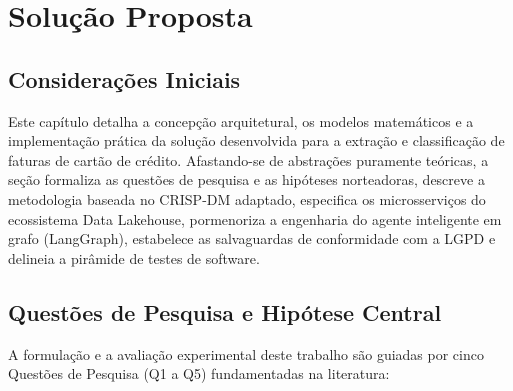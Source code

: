 \documentclass[
	12pt,				
	openright,			
	oneside,			
	a4paper,			
	english,			
	brazil				
	]{abntex2}
\begin{document}
\chapter{Solução Proposta}
\label{chp:solucao_proposta}

\section{Considerações Iniciais}
\label{sec:sol_consideracoes_iniciais}

Este capítulo detalha a concepção arquitetural, os modelos matemáticos e a implementação prática da solução desenvolvida para a extração e classificação de faturas de cartão de crédito. Afastando-se de abstrações puramente teóricas, a seção formaliza as questões de pesquisa e as hipóteses norteadoras, descreve a metodologia baseada no CRISP-DM adaptado, especifica os microsserviços do ecossistema Data Lakehouse, pormenoriza a engenharia do agente inteligente em grafo (LangGraph), estabelece as salvaguardas de conformidade com a LGPD e delineia a pirâmide de testes de software.

\section{Questões de Pesquisa e Hipótese Central}
\label{sec:sol_questoes_pesquisa}

A formulação e a avaliação experimental deste trabalho são guiadas por cinco Questões de Pesquisa (Q1 a Q5) fundamentadas na literatura:
\end{document}

